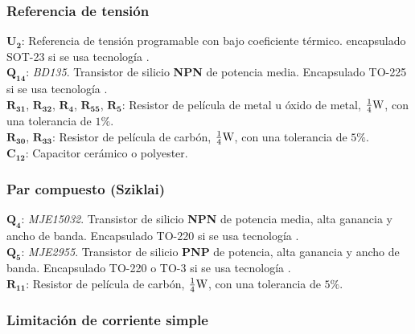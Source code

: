 \subsubsection{Referencia de tensión}

$\bm{U_{2}}$: Referencia de tensión programable con bajo coeficiente térmico. encapsulado SOT-23 si se usa tecnología .\\



$\bm{Q_{14}}$: \textit{BD135}. Transistor de silicio \textbf{NPN} de potencia media. Encapsulado TO-225 si se usa tecnología .\\


$\bm{R_{31}}$, $\bm{R_{32}}$, $\bm{R_{4}}$, $\bm{R_{55}}$, $\bm{R_{5}}$: Resistor de película de metal u óxido de metal, $\frac{1}{4} \si[per-mode=symbol]{\watt}$, con una tolerancia de $1 \%$.\\


$\bm{R_{30}}$, $\bm{R_{33}}$: Resistor de película de carbón, $\frac{1}{4} \si[per-mode=symbol]{\watt}$, con una tolerancia de $5 \%$.\\


$\bm{C_{12}}$: Capacitor cerámico o polyester.\\


 \subsubsection{Par compuesto (Sziklai)}

$\bm{Q_{4}}$: \textit{MJE15032}. Transistor de silicio \textbf{NPN} de potencia media, alta ganancia y ancho de banda. Encapsulado TO-220 si se usa tecnología .\\

$\bm{Q_{5}}$: \textit{MJE2955}. Transistor de silicio \textbf{PNP} de potencia, alta ganancia y ancho de banda. Encapsulado TO-220 o TO-3 si se usa tecnología .\\

$\bm{R_{11}}$: Resistor de película de carbón, $\frac{1}{4} \si[per-mode=symbol]{\watt}$, con una tolerancia de $5 \%$.\\


\subsubsection{Limitación de corriente simple}


